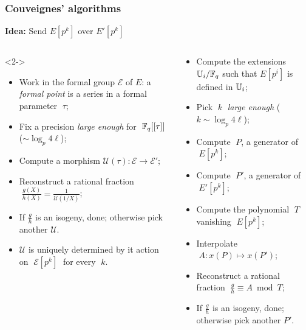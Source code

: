 \documentclass[10pt]{beamer}
\begin{document}
{
\begin{frame}
  \frametitle{Couveignes' algorithms}
  
  \begin{center}
    \textbf{Idea:} Send $E[p^k]$ over $E'[p^k]$
  \end{center}

  \begin{columns}[t]
    \begin{column}{0.5\textwidth}
      \centering\cite{couveignes94}

      \begin{uncoverenv}<2->
        \begin{itemize}
        \item Work in the formal group $\mathcal{E}$ of $E$: a
          \emph{formal point} is a series in a formal parameter
          $\;\tau$;
        \item Fix a precision \emph{large enough} for
          $\;\mathbb{F}_q[[\tau]]$ ($\sim\log_p4\ell$);
        \item Compute a morphism $\mathcal{U}(\tau) : \mathcal{E}
          \to \mathcal{E}'$;
        \item Reconstruct a rational fraction $\;\frac{g(X)}{h(X)} =
          \frac{1}{\mathcal{U}(1/X)}$;
        \item If $\frac{g}{h}$ is an isogeny, done; otherwise pick
          another $\mathcal{U}$.
        \item<3> $\mathcal{U}$ is uniquely determined by it action on
          $\;\mathcal{E}[p^k]\;$ for every $\;k$.
        \end{itemize}
      \end{uncoverenv}
    \end{column}
    \begin{column}{0.5\textwidth}
      \centering\cite{couveignes96}
      
      \begin{itemize}
      \item Compute the extensions $\mathbb{U}_i/\mathbb{F}_q$
        such that $E[p^i]$ is defined in $\mathbb{U}_i$;
      \item Pick $\;k\;$ \emph{large enough} ($k\sim\log_p4\ell$);
      \item Compute $\;P$, a generator of $\;E[p^k]$;
      \item Compute $\;P'$, a generator of $\;E'[p^k]$;
      \item Compute the polynomial $\;T\;$ vanishing $\;E[p^k]$;
      \item Interpolate $\;A : x(P) \mapsto x(P')$;
      \item Reconstruct a rational fraction  $\;\frac{g}{h}\equiv A \bmod T$;
      \item If $\frac{g}{h}$ is an isogeny, done; otherwise pick another $P'$.
      \end{itemize}
    \end{column}
  \end{columns}
\end{frame}
}
\end{document}
